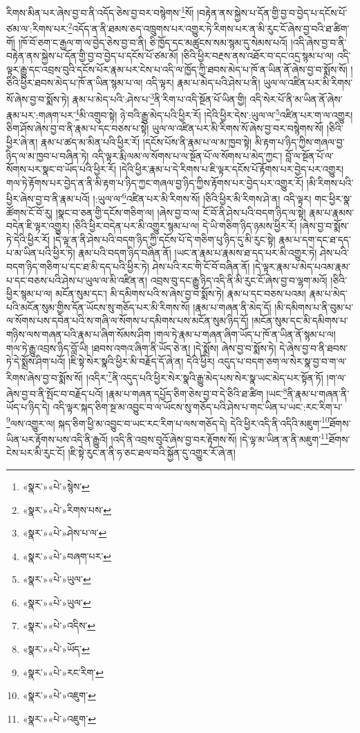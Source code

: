 རིགས་མིན་པར་ཞེས་བྱ་བ་ནི་འདོད་ཅེས་བྱ་བར་བསྙེགས་\footnote{«སྣར་»«པེ་»སྙེས་}སོ། །བརྟེན་ནས་སྐྱེས་པ་དོན་གྱི་བྱ་བ་བྱེད་པ་དངོས་པོ་ཙམ་ལ་:རིགས་པར་\footnote{«སྣར་»«པེ་»རིགས་པས་}འདོད་ན་ནི་ཐམས་ཅད་འཁྲུགས་པར་འགྱུར་ཏེ་རིགས་པར་ན་མི་རུང་ངོ་ཞེས་བྱ་བའི་ཐ་ཚིག་གོ། །ཁོ་བོ་ཅག་ང་རྒྱལ་ག་ལ་བྱེད་ཅེས་བྱ་བ་ནི། ཅི་ཁྱོད་དང་མཚུངས་སམ་སྙམ་དུ་སེམས་པའོ། །འདི་ཞེས་བྱ་བ་ནི་བརྟེན་ནས་སྐྱེས་པ་དོན་གྱི་བྱ་བ་བྱེད་པ་དངོས་པོ་ཙམ་མོ། །ཅིའི་ཕྱིར་བརྔས་ནས་འཐོར་བ་དང་འདྲ་སྙམ་པ་ལ། འདི་ལྟར་རྒྱུ་དང་འབྲས་བུའི་དངོས་པོར་རྣམ་པར་ངེས་པ་འདི་ལ་ཁྱོད་ཀྱི་ཐབས་མེད་པ་ཁོ་ན་ཡིན་ནོ་ཞེས་བྱ་བ་སྨོས་སོ། །ཅིའི་ཕྱིར་ཐབས་མེད་པ་ཁོ་ན་ཡིན་སྙམ་པ་ལ། འདི་ལྟར། རྣམ་པ་མེད་པའི་ཤེས་པ་ནི། ཡུལ་ལ་འཛིན་པར་མི་རིགས་སོ་ཞེས་བྱ་བ་སྨོས་ཏེ། རྣམ་པ་མེད་པའི་:ཤེས་པ་\footnote{«སྣར་»«པེ་»ཤེས་པ་ལ་}ནི་རིག་པ་འདི་སྔོན་པོ་ཡིན་གྱི། འདི་སེར་པོ་ནི་མ་ཡིན་ནོ་ཞེས་རྣམ་པར་:གཞག་པར་\footnote{«སྣར་»«པེ་»བཞག་པར་}མི་འགྲུབ་སྟེ། ཉེ་བའི་རྒྱུ་མེད་པའི་ཕྱིར་རོ། །དེའི་ཕྱིར་དེས་:ཡུལ་ལ་\footnote{«སྣར་»«པེ་»ཡུལ་}འཛིན་པར་ག་ལ་འགྱུར། ཅིག་ཤོས་ཞེས་བྱ་བ་ནི་རྣམ་པ་དང་བཅས་པ་སྟེ། ཡུལ་ལ་འཛིན་པར་མི་རིགས་སོ་ཞེས་བྱ་བར་བསྙེགས་སོ། །ཅིའི་ཕྱིར་ཞེ་ན། རྣམ་པ་ཚད་མ་མིན་པའི་ཕྱིར་རོ། །དངོས་པོས་ནི་རྣམ་པ་ལ་མ་ཁྱབ་སྟེ། མི་རྟག་པ་ཉིད་ཀྱིས་གཞལ་བྱ་ཉིད་ལ་མ་ཁྱབ་པ་བཞིན་ཏེ། འདི་ལྟར་རྨི་ལམ་ལ་སོགས་པ་ལ་སྔོན་པོ་ལ་སོགས་པ་མེད་ཀྱང་། བློ་ལ་སྔོན་པོ་ལ་སོགས་པར་སྣང་བ་ཡོད་པའི་ཕྱིར་རོ། །དེའི་ཕྱིར་རྣམ་པ་དེ་རིགས་པ་ཇི་ལྟར་དངོས་པོ་རྟོགས་པར་བྱེད་པར་འགྱུར། གལ་ཏེ་རྟོགས་པར་བྱེད་ན་ནི་མི་རྟག་པ་ཉིད་ཀྱང་གཞལ་བྱ་ཉིད་ཀྱིས་རྟོགས་པར་བྱེད་པར་འགྱུར་རོ། །མི་རིགས་པའི་ཕྱིར་ཞེས་བྱ་བ་ནི་རྣམ་པའོ། །:ཡུལ་ལ་\footnote{«སྣར་»«པེ་»ཡུལ་}འཛིན་པར་མི་རིགས་སོ། །ཅིའི་ཕྱིར་མི་རིགས་ཤེ་ན། འདི་ལྟར། གང་ཕྱིར་སྣ་ཚོགས་ངོ་བོ་རུ། །སྣང་བ་ཅན་གྱི་དངོས་གཅིག་ལ། །ཞེས་བྱ་བ་ལ། ངོ་བོ་ནི་ཤེས་པའི་བདག་ཉིད་ལ་སྟེ། རྣམ་པ་རྣམས་བདེན་ཇི་ལྟར་འགྱུར། །ཅིའི་ཕྱིར་བདེན་པར་མི་འགྱུར་སྙམ་པ་ལ། དེ་ཡི་གཅིག་ཉིད་ཉམས་ཕྱིར་རོ། །ཞེས་བྱ་བ་སྨོས་ཏེ་དེའི་ཕྱིར་རོ། །དེ་ལྟ་ན་ནི་ཤེས་པའི་བདག་ཉིད་ཀྱི་དངོས་པོ་དེ་གཅིག་པུ་ཉིད་དུ་མི་རུང་སྟེ། རྣམ་པ་དག་དང་ཐ་དད་པ་མ་ཡིན་པའི་ཕྱིར་ཏེ། རྣམ་པའི་བདག་ཉིད་བཞིན་ནོ། །ཡང་ན་རྣམ་པ་རྣམས་ཐ་དད་པར་མི་འགྱུར་ཏེ། ཤེས་པའི་བདག་ཉིད་གཅིག་པ་དང་ཐ་མི་དད་པའི་ཕྱིར་ཏེ། ཤེས་པའི་རང་གི་ངོ་བོ་བཞིན་ནོ། །དེ་ལྟར་རྣམ་པ་མེད་པའམ་རྣམ་པ་དང་བཅས་པའི་ཤེས་པ་ཡུལ་ལ་མི་འཛིན་ན། འབྲས་བུ་དང་རྒྱུ་ཉིད་འདི་ནི་མི་རུང་ངོ་ཞེས་བྱ་བ་ལྷག་མའོ། །ཅིའི་ཕྱིར་སྙམ་པ་ལ། མངོན་སུམ་དང་། མི་དམིགས་པའི་ས་ཞེས་བྱ་བ་སྨོས་ཏེ། རྣམ་པ་དང་བཅས་པའམ། རྣམ་པ་མེད་པའི་མངོན་སུམ་གྱིས་དོན་ཡོངས་སུ་གཅོད་པར་མི་རིགས་སོ། །རྣམ་པ་གཞན་ནི་མེད་དོ། །མི་དམིགས་པ་ནི་བུམ་པ་ལ་སོགས་པས་དབེན་པའི་ས་གཞི་ལ་སོགས་པ་དམིགས་པས་མངོན་སུམ་ཉིད་དོ། །མངོན་སུམ་དང་མི་དམིགས་པ་གཉིས་ལས་གཞན་པའི་རྣམ་པ་ཞིག་སོམས་ཤིག །གལ་ཏེ་རྣམ་པ་གཞན་ཞིག་ཡོད་པ་ཁོ་ན་ཡིན་ནོ་སྙམ་པ་ལ། གལ་ཏེ་རྒྱུ་འབྲས་ཉིད་བློ་ཡི། །ཐབས་འགའ་ཞིག་ནི་ཡོད་ཅེ་ན། །དེ་སྨྲོས། ཞེས་བྱ་བ་སྨོས་ཏེ། དེ་ཞེས་བྱ་བ་ནི་ཐབས་ཏེ་དེ་སྨྲོས་ཤིག་པའོ། །ཇི་སྟེ་སེར་སྣའི་ཕྱིར་མི་བརྗོད་དོ་ཞེ་ན། དེའི་ཕྱིར། འདུད་པ་བདག་ཅག་ལ་སེར་སྣ་བྱ་བ་ག་ལ་རིགས་ཞེས་བྱ་བ་སྨོས་སོ། །འདིར་\footnote{«སྣར་»«པེ་»འདིས་}ནི་འདུད་པའི་ཕྱིར་སེར་སྣའི་རྒྱུ་མེད་པས་སེར་སྣ་ཡང་མེད་པར་སྟོན་ཏོ། །ག་ལ་ཞེས་བྱ་བ་ནི་སྤོང་བ་བརྗོད་པའོ། །རྣམ་པ་གཞན་དཔྱོད་ཅིག་ཅེས་བྱ་བ་དེ་ཅིའི་ཐ་ཚིག །ཡང་\footnote{«སྣར་»«པེ་»ཡོད་}ནི་རྣམ་པ་གཞན་ནི་ཡོད་པ་ཉིད་དེ། འདི་ལྟར་སྐད་ཅིག་སྔ་མ་འབྱུང་བ་ལ་ཡོངས་སུ་གཅོད་པའི་ཤེས་པ་གང་ཡིན་པ་ཡང་:རང་རིག་པ་\footnote{«སྣར་»«པེ་»རང་རིག་}ལས་འགྱུར་ལ། སྐད་ཅིག་ཕྱི་མ་འབྱུང་བ་ཡང་རང་རིག་པ་ལས་གཅོད་དེ། དེའི་ཕྱིར་འདི་ནི་འདིའི་མཇུག་\footnote{«སྣར་»«པེ་»འཇུག་}ཐོགས་ཡིན་པར་རྟོགས་པས་འདི་ནི་རྒྱུའོ། །འདི་ནི་འབྲས་བུའོ་ཞེས་བྱ་བར་རྟོགས་སོ། །དེ་ལྟ་མ་ཡིན་ན་ནི་མཇུག་\footnote{«སྣར་»«པེ་»འཇུག་}ཐོགས་ངེས་པར་མི་རུང་ངོ། །ཇི་སྟེ་རུང་ན་ནི་ཧ་ཅང་ཐལ་བའི་སྐྱོན་དུ་འགྱུར་རོ་ཞེ་ན། 
